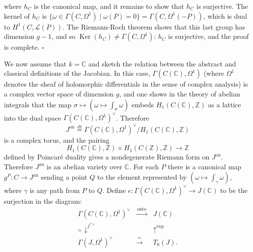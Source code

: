 

where $h_C$ is the canonical map, and it remains to show that $h_C$ is
surjective. The kernel of $h_C$ is
$\{\omega \in \Gamma(C, \Omega^1) \mid \omega(P) = 0\}
= \Gamma(C, \Omega^1(-P))$, which is dual to
$H^1(C, \mathcal{L}(P))$. The Riemann-Roch theorem shows that this last group
has dimension $g-1$, and so
$\operatorname{Ker}(h_C) \ne \Gamma(C, \Omega^1)$: $h_C$ is surjective, and
the proof is complete. \hfill $\square$

We now assume that $k = \mathbb{C}$ and sketch the relation between the
abstract and classical definitions of the Jacobian. In this case,
$\Gamma(C(\mathbb{C}), \Omega^1)$ (where $\Omega^1$ denotes the sheaf of
holomorphic differentials in the sense of complex analysis) is a complex
vector space of dimension $g$, and one shows in the theory of abelian
integrals that the map
$\sigma \mapsto (\omega \mapsto \int_\sigma \omega)$ embeds
$H_1(C(\mathbb{C}), \mathbb{Z})$ as a lattice into the dual space
$\Gamma(C(\mathbb{C}), \Omega^1)^\vee$. Therefore
\[
  J^{\mathrm{an}} \overset{\mathrm{df}}{=}
  \Gamma(C(\mathbb{C}), \Omega^1)^\vee/H_1(C(\mathbb{C}), \mathbb{Z})
\]
is a complex torus, and the pairing
\[
  H_1(C(\mathbb{C}), \mathbb{Z}) \times
  H_1(C(\mathbb{Z}), \mathbb{Z}) \to \mathbb{Z}
\]
defined by Poincar\'e duality gives a nondegenerate Riemann form on
$J^{\mathrm{an}}$. Therefore $J^{\mathrm{an}}$ is an abelian variety over
$\mathbb{C}$. For each $P$ there is a canonical map
$g^P \colon C \to J^{\mathrm{an}}$ sending a point $Q$ to the element
represented by $(\omega \mapsto \int_\gamma \omega)$, where $\gamma$ is any
path from $P$ to $Q$. Define
$e \colon \Gamma(C(\mathbb{C}), \Omega^1)^\vee \to J(\mathbb{C})$ to be the
surjection in the diagram:
\[
\begin{array}{ccc}
  \Gamma(C(\mathbb{C}), \Omega^1)^\vee &
    \xrightarrow{\ \mathrm{onto}\ } & J(\mathbb{C}) \\
  {}_{\simeq}\!\downarrow^{f^{*\vee}} && \uparrow^{\exp} \\
  \Gamma(J, \Omega^1)^\vee & \xrightarrow{\ \simeq\ } & T_0(J).
\end{array}
\]

